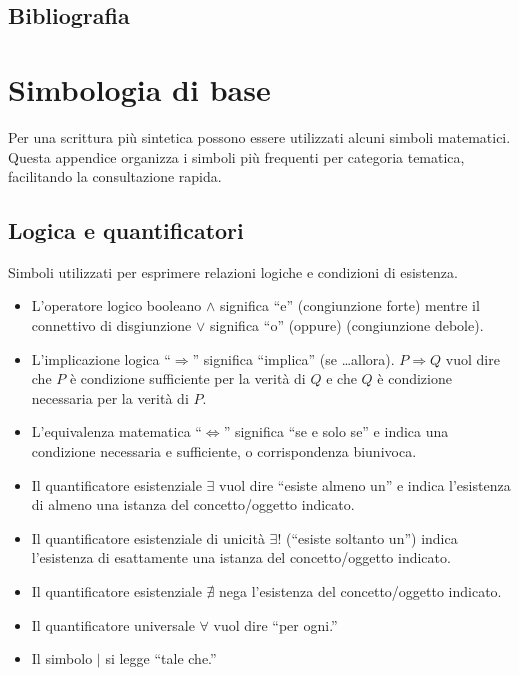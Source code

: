 \documentclass[
  italian,
  letterpaper,
  a4paper,
  11pt,
  open=any]{scrbook}
\providecommand{\tightlist}{%
  \setlength{\itemsep}{0pt}\setlength{\parskip}{0pt}}
\theoremstyle{plain}
\theoremstyle{definition}
\theoremstyle{definition}
\theoremstyle{remark}
\begin{document}
\section*{Bibliografia}\label{bibliografia-10}


\cleardoublepage
{}
{}
\appendix

\chapter{Simbologia di base}\label{sec-apx-math-symbols}

Per una scrittura più sintetica possono essere utilizzati alcuni simboli
matematici. Questa appendice organizza i simboli più frequenti per
categoria tematica, facilitando la consultazione rapida.

\section{Logica e quantificatori}\label{logica-e-quantificatori}

Simboli utilizzati per esprimere relazioni logiche e condizioni di
esistenza.

\begin{itemize}
\tightlist
\item
  L'operatore logico booleano \(\land\) significa ``e'' (congiunzione
  forte) mentre il connettivo di disgiunzione \(\lor\) significa ``o''
  (oppure) (congiunzione debole).
\item
  L'implicazione logica ``\(\Rightarrow\)'' significa ``implica'' (se
  \ldots allora). \(P \Rightarrow Q\) vuol dire che \(P\) è condizione
  sufficiente per la verità di \(Q\) e che \(Q\) è condizione necessaria
  per la verità di \(P\).
\item
  L'equivalenza matematica ``\(\iff\)'' significa ``se e solo se'' e
  indica una condizione necessaria e sufficiente, o corrispondenza
  biunivoca.
\item
  Il quantificatore esistenziale \(\exists\) vuol dire ``esiste almeno
  un'' e indica l'esistenza di almeno una istanza del concetto/oggetto
  indicato.
\item
  Il quantificatore esistenziale di unicità \(\exists!\) (``esiste
  soltanto un'') indica l'esistenza di esattamente una istanza del
  concetto/oggetto indicato.
\item
  Il quantificatore esistenziale \(\nexists\) nega l'esistenza del
  concetto/oggetto indicato.
\item
  Il quantificatore universale \(\forall\) vuol dire ``per ogni.''
\item
  Il simbolo \(\vert\) si legge ``tale che.''
\end{itemize}
\end{document}
